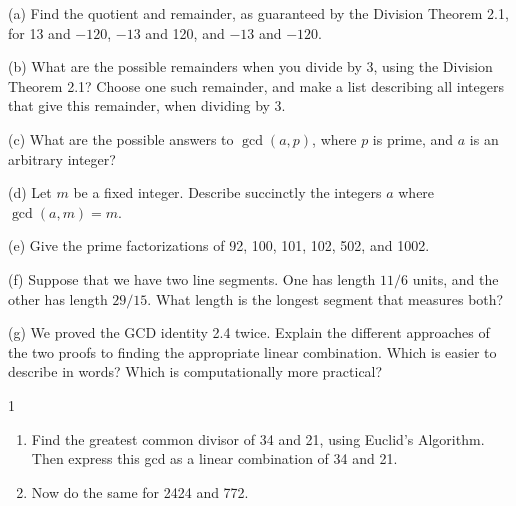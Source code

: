 \begin{problem}[Warmup]{(a)}
    Find the quotient and remainder, as guaranteed by the Division Theorem 2.1, for 13 and $-120$, $-13$ and 120, and $-13$ and $-120$.
\end{problem}
\unsolved

\begin{problem}[Warmup]{(b)}
    What are the possible remainders when you divide by 3, using the Division Theorem 2.1? Choose one such remainder, and make a list describing all integers that give this remainder, when dividing by 3.
\end{problem}
\unsolved

\begin{problem}[Warmup]{(c)}
    What are the possible answers to $\gcd(a, p)$, where $p$ is prime, and $a$ is an arbitrary integer?
\end{problem}
\unsolved

\begin{problem}[Warmup]{(d)}
    Let $m$ be a fixed integer. Describe succinctly the integers $a$ where $\gcd(a, m) = m$.
\end{problem}
\unsolved

\begin{problem}[Warmup]{(e)}
    Give the prime factorizations of 92, 100, 101, 102, 502, and 1002.
\end{problem}
\unsolved

\begin{problem}[Warmup]{(f)}
    Suppose that we have two line segments. One has length $11/6$ units, and the other has length $29/15$. What length is the longest segment that measures both?
\end{problem}
\unsolved

\begin{problem}[Warmup]{(g)}
    We proved the GCD identity 2.4 twice. Explain the different approaches of the two proofs to finding the appropriate linear combination. Which is easier to describe in words? Which is computationally more practical?
\end{problem}
\unsolved

\begin{problem}{1}
    \begin{enumerate}
        \item[(a)] Find the greatest common divisor of 34 and 21, using Euclid's Algorithm.
        Then express this gcd as a linear combination of 34 and 21.
        \item[(b)] Now do the same for 2424 and 772.
    \end{enumerate}
\end{problem}
\unsolved

